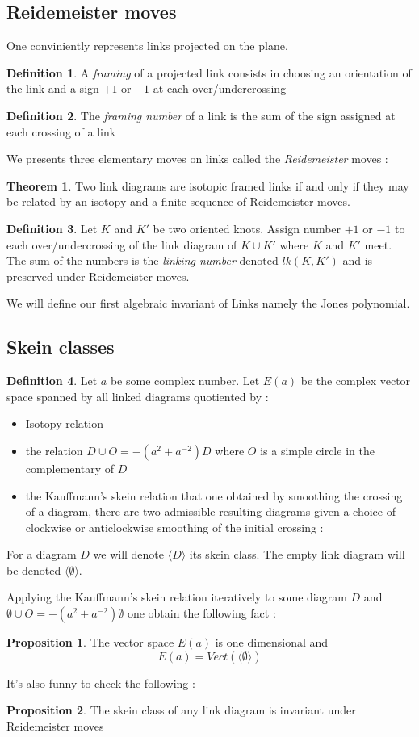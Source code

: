 \documentclass{article}
\theoremstyle{definition}
\newtheorem{theo}{Theorem}[section]
\newtheorem{Prop}{Proposition}[section]
\newtheorem{Def}{Definition}[section]
\begin{document}
\subsection{Reidemeister moves} One conviniently represents links projected on the plane.
\begin{Def}A \textit{framing} of a projected link consists in choosing an orientation of the link and a sign $+1$ or $-1$ at each over/undercrossing \end{Def}
\begin{Def}
The \textit{framing number} of a link is the sum of the sign assigned at each crossing of a link
\end{Def}
We presents three elementary moves on links called the \textit{Reidemeister} moves :\pagebreak
\begin{theo} Two link diagrams are isotopic framed links if and only if they may be related by an isotopy and a finite sequence of Reidemeister moves.
\end{theo}
\begin{Def} Let $K$ and $K'$ be two oriented knots. Assign number $+1$ or $-1$ to each over/undercrossing of the link diagram of $K\cup K'$ where $K$ and $K'$ meet. The sum of the numbers is the \textit{linking number} denoted $lk(K,K')$ and is preserved under Reidemeister moves.
\end{Def}

We will define our first algebraic invariant of Links namely the Jones polynomial.
\subsection{Skein classes}
\begin{Def} Let $a$ be some complex number. Let $E(a)$ be the complex vector space spanned by all linked diagrams quotiented by : \begin{itemize}
\item Isotopy relation
\item the relation $D\cup O=-(a^2+a^{-2})D$ where $O$ is a simple circle in the complementary of $D$
\item the Kauffmann's skein relation that one obtained by smoothing the crossing of a diagram, there are two admissible resulting diagrams  given a choice of clockwise or anticlockwise smoothing of the initial crossing :  \vspace{10cm}
\end{itemize}
For a diagram $D$ we will denote $\langle D\rangle $ its skein class. The empty link diagram will be denoted $\langle \emptyset\rangle$.
\end{Def}
Applying the Kauffmann's skein relation iteratively to some diagram  $D$ and $\emptyset\cup O=-(a^2+a^{-2})\emptyset$  one obtain the following fact :
\begin{Prop}\label{Edim1}
The vector space $E(a)$ is one dimensional and $$E(a)=Vect(\langle\emptyset\rangle)$$ 
\end{Prop}
It's also funny to check the following : 
\begin{Prop}\label{skeininv}
The skein class of any link diagram is invariant under Reidemeister moves
\end{Prop}
\vspace{10cm}
\end{document}
